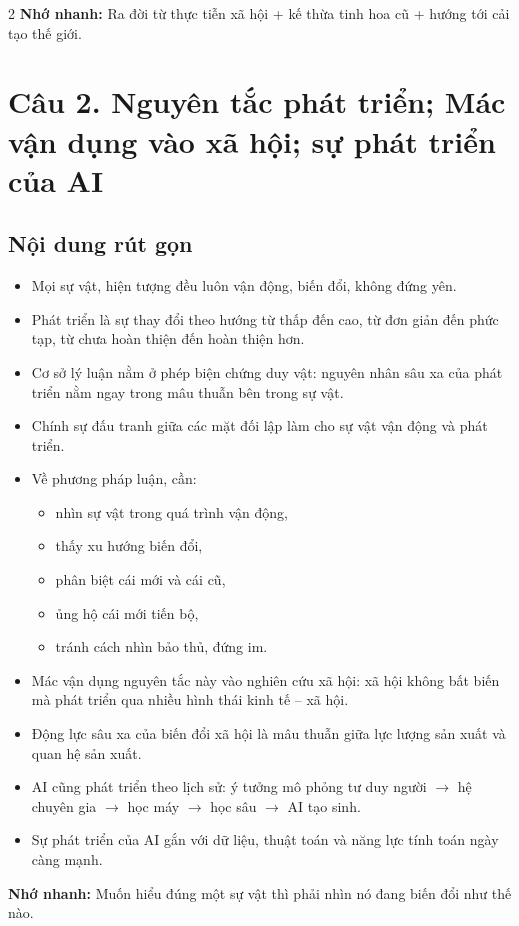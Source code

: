\documentclass[9pt,a4paper]{extarticle}
\begin{document}
\begin{multicols*}{2}
\textbf{Nhớ nhanh:} Ra đời từ thực tiễn xã hội + kế thừa tinh hoa cũ + hướng tới cải tạo thế giới.

\section*{Câu 2. Nguyên tắc phát triển; Mác vận dụng vào xã hội; sự phát triển của AI}
\subsection*{Nội dung rút gọn}
\begin{itemize}
  \item Mọi sự vật, hiện tượng đều luôn vận động, biến đổi, không đứng yên.
  \item Phát triển là sự thay đổi theo hướng từ thấp đến cao, từ đơn giản đến phức tạp, từ chưa hoàn thiện đến hoàn thiện hơn.
  \item Cơ sở lý luận nằm ở phép biện chứng duy vật: nguyên nhân sâu xa của phát triển nằm ngay trong mâu thuẫn bên trong sự vật.
  \item Chính sự đấu tranh giữa các mặt đối lập làm cho sự vật vận động và phát triển.
  \item Về phương pháp luận, cần:
  \begin{itemize}
    \item nhìn sự vật trong quá trình vận động,
    \item thấy xu hướng biến đổi,
    \item phân biệt cái mới và cái cũ,
    \item ủng hộ cái mới tiến bộ,
    \item tránh cách nhìn bảo thủ, đứng im.
  \end{itemize}
  \item Mác vận dụng nguyên tắc này vào nghiên cứu xã hội: xã hội không bất biến mà phát triển qua nhiều hình thái kinh tế -- xã hội.
  \item Động lực sâu xa của biến đổi xã hội là mâu thuẫn giữa lực lượng sản xuất và quan hệ sản xuất.
  \item AI cũng phát triển theo lịch sử: ý tưởng mô phỏng tư duy người $\rightarrow$ hệ chuyên gia $\rightarrow$ học máy $\rightarrow$ học sâu $\rightarrow$ AI tạo sinh.
  \item Sự phát triển của AI gắn với dữ liệu, thuật toán và năng lực tính toán ngày càng mạnh.
\end{itemize}

\textbf{Nhớ nhanh:} Muốn hiểu đúng một sự vật thì phải nhìn nó đang biến đổi như thế nào.


\end{multicols*}
\end{document}
